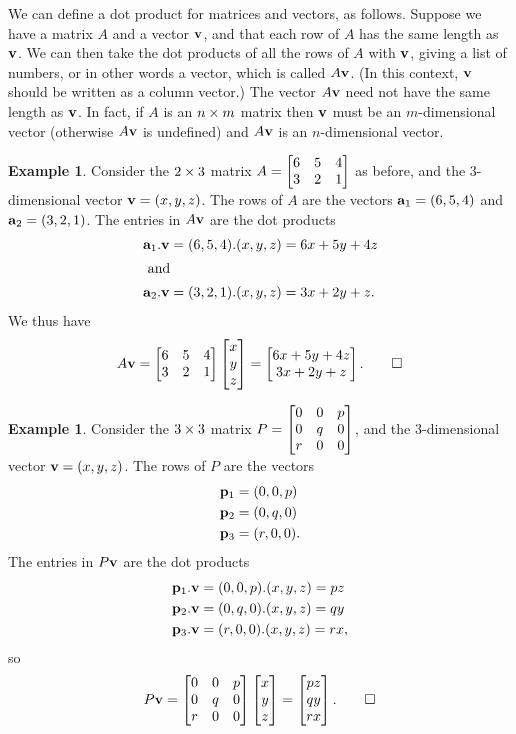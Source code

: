 \documentclass[a4paper]{book}
\theoremstyle{definition}
\newtheorem{example}[theorem]{Example}
\begin{document}
We can define a dot product for matrices and vectors, as follows.
Suppose we have a matrix $A$ and a vector $\mathbf{v}$, and that each row
of $A$ has the same length as $\mathbf{v}$.  We can then take the dot
products of all the rows of $A$ with $\mathbf{v}$, giving a list of
numbers, or in other words a vector, which is called $A\mathbf{v}$.  (In
this context, $\mathbf{v}$ should be written as a column vector.)  The
vector $A\mathbf{v}$ need not have the same length as $\mathbf{v}$.  In
fact, if $A$ is an $n\times m$ matrix then $\mathbf{v}$ must be an
$m$-dimensional vector (otherwise $A\mathbf{v}$ is undefined) and
$A\mathbf{v}$ is an $n$-dimensional vector.
\begin{example}
 Consider the $2\times 3$ matrix
 $A=\begin{bmatrix} 6 & 5 & 4 \\ 3 & 2 & 1 \end{bmatrix}$
 as before, and the $3$-dimensional vector $\mathbf{v}=(x,y,z)$.  The
 rows of $A$ are the vectors $\mathbf{a}_1=(6,5,4)$ and
 $\mathbf{a}_2=(3,2,1)$.  The entries in $A\mathbf{v}$ are the dot products
 \begin{align*}
  \mathbf{a}_1.\mathbf{v} &= (6,5,4).(x,y,z) = 6x+5y+4z \\
  \intertext{ and }
  \mathbf{a}_2.\mathbf{v} &= (3,2,1).(x,y,z) = 3x+2y+z.
 \end{align*}
 We thus have
 \[ A\mathbf{v} = 
     \begin{bmatrix} 6 & 5 & 4 \\ 3 & 2 & 1 \end{bmatrix} 
     \begin{bmatrix} x \\ y \\ z \end{bmatrix} = 
     \begin{bmatrix} 6x+5y+4z \\ 3x+2y+z  \end{bmatrix}. \qed
 \]
\end{example}
\begin{example}
 Consider the $3\times 3$ matrix
 $P=\begin{bmatrix} 0&0&p \\ 0&q&0 \\ r&0&0 \end{bmatrix}$,
 and the $3$-dimensional vector $\mathbf{v}=(x,y,z)$.  The
 rows of $P$ are the vectors 
 \begin{align*}
  \mathbf{p}_1 &= (0,0,p) \\
  \mathbf{p}_2 &= (0,q,0) \\
  \mathbf{p}_3 &= (r,0,0).
 \end{align*}
 The entries in $P\mathbf{v}$ are the dot products
 \begin{align*}
  \mathbf{p}_1.\mathbf{v} &= (0,0,p).(x,y,z) = pz \\
  \mathbf{p}_2.\mathbf{v} &= (0,q,0).(x,y,z) = qy \\
  \mathbf{p}_3.\mathbf{v} &= (r,0,0).(x,y,z) = rx,
 \end{align*}
 so
 \[ P\mathbf{v} = 
     \begin{bmatrix} 0&0&p \\ 0&q&0 \\ r&0&0 \end{bmatrix}
     \begin{bmatrix} x \\ y \\ z \end{bmatrix} = 
     \begin{bmatrix} pz \\ qy \\ rx  \end{bmatrix}. \qed
 \]
\end{example}
\end{document}
